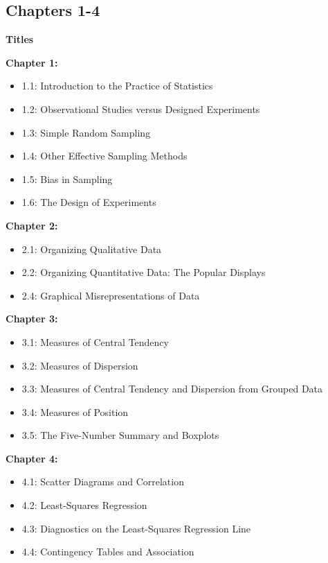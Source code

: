 \documentclass{report}
\begin{document}
      \subsection*{Chapters 1-4}
      \bigbreak \noindent 
      \begin{large}
        \textbf{Titles}
      \end{large}
      \bigbreak \noindent 
      \textbf{Chapter 1:}
        \begin{itemize}
          \item 1.1: Introduction to the Practice of Statistics
          \item 1.2: Observational Studies versus Designed Experiments
          \item 1.3: Simple Random Sampling
          \item 1.4: Other Effective Sampling Methods
          \item 1.5: Bias in Sampling
          \item 1.6: The Design of Experiments
        \end{itemize}
      \textbf{Chapter 2:}
        \begin{itemize}
          \item 2.1: Organizing Qualitative Data
          \item 2.2: Organizing Quantitative Data: The Popular Displays
          \item 2.4: Graphical Misrepresentations of Data
        \end{itemize}
      \textbf{Chapter 3:}
        \begin{itemize}
          \item 3.1: Measures of Central Tendency
          \item 3.2: Measures of Dispersion
          \item 3.3: Measures of Central Tendency and Dispersion from Grouped Data
          \item 3.4: Measures of Position
          \item 3.5: The Five-Number Summary and Boxplots
        \end{itemize}
      \textbf{Chapter 4:}
        \begin{itemize}
          \item 4.1: Scatter Diagrams and Correlation
          \item 4.2: Least-Squares Regression
          \item 4.3: Diagnostics on the Least-Squares Regression Line
          \item 4.4: Contingency Tables and Association
        \end{itemize}
\end{document}
